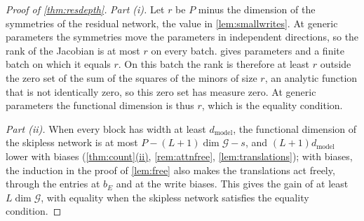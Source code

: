 \documentclass[10pt]{article}
\theoremstyle{definition}
\theoremstyle{remark}
\newcommand{\dm}{d_{\mathrm{model}}}
\newcommand{\G}{\mathcal{G}}
\DeclareRobustCommand{\cpref}[2]{\hyperref[#1:#2]{\cref*{#1}(#2)}}
\begin{document}
\begin{proof}[Proof of \cref{thm:resdepth}]
\emph{Part (i).} Let $r$ be $P$ minus the dimension of the symmetries of the residual network, the value in \cref{lem:smallwrites}. At generic parameters the symmetries move the parameters in independent directions, so the rank of the Jacobian is at most $r$ on every batch.  gives parameters and a finite batch on which it equals $r$. On this batch the rank is therefore at least $r$ outside the zero set of the sum of the squares of the minors of size $r$, an analytic function that is not identically zero, so this zero set has measure zero. At generic parameters the functional dimension is thus $r$, which is the equality condition.

\emph{Part (ii).} When every block has width at least $\dm$, the functional dimension of the skipless network is at most $P - (L+1)\dim\G - s$, and $(L+1)\dm$ lower with biases (\cpref{thm:count}{ii}, \cref{rem:attnfree}, \cref{lem:translations}); with biases, the induction in the proof of \cref{lem:free} also makes the translations act freely, through the entries at $b_E$ and at the write biases. This gives the gain of at least $L\dim\G$, with equality when the skipless network satisfies the equality condition.
\end{proof}
\end{document}
